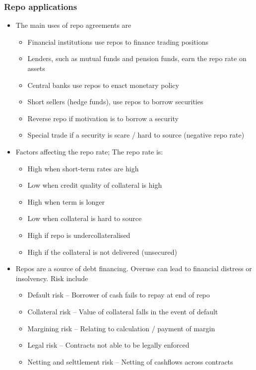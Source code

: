 \documentclass[../notes_compiled.tex]{subfiles}
\begin{document}
\subsubsection{Repo applications}
\begin{itemize}
\item The main uses of repo agreements are
\begin{itemize}
\item Financial institutions use repos to finance trading positions
\item Lenders, such as mutual funds and pension funds, earn the repo rate on assets
\item Central banks use repos to enact monetary policy
\item Short sellers (hedge funds), use repos to borrow securities
\item Reverse repo if motivation is to borrow a security
\item Special trade if a security is scare / hard to source (negative repo rate)
\end{itemize}
\item Factors affecting the repo rate; The repo rate is:
\begin{itemize}
\item High when short-term rates are high
\item Low when credit quality of collateral is high
\item High when term is longer
\item Low when collateral is hard to source
\item High if repo is undercollateralised
\item High if the collateral is not delivered (unsecured)
\end{itemize}
\item Repos are a source of debt financing. Overuse can lead to financial distress or insolvency. Risk include
\begin{itemize}
\item Default risk -- Borrower of cash fails to repay at end of repo
\item Collateral risk -- Value of collateral falls in the event of default
\item Margining risk -- Relating to calculation / payment of margin
\item Legal risk -- Contracts not able to be legally enforced
\item Netting and selttlement risk -- Netting of cashflows across contracts
\end{itemize}

\end{itemize}
\end{document}
